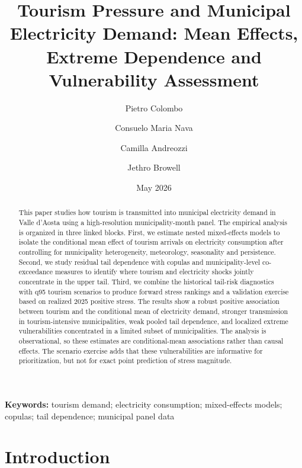 \documentclass[11pt,a4paper]{article}
\title{Tourism Pressure and Municipal Electricity Demand: Mean Effects, Extreme Dependence and Vulnerability Assessment}
\author{Pietro Colombo \and Consuelo Maria Nava \and Camilla Andreozzi \and Jethro Browell}
\date{May 2026}
\begin{document}
\maketitle

\begin{abstract}
This paper studies how tourism is transmitted into municipal electricity demand in Valle d'Aosta using a high-resolution municipality-month panel. The empirical analysis is organized in three linked blocks. First, we estimate nested mixed-effects models to isolate the conditional mean effect of tourism arrivals on electricity consumption after controlling for municipality heterogeneity, meteorology, seasonality and persistence. Second, we study residual tail dependence with copulas and municipality-level co-exceedance measures to identify where tourism and electricity shocks jointly concentrate in the upper tail. Third, we combine the historical tail-risk diagnostics with q95 tourism scenarios to produce forward stress rankings and a validation exercise based on realized 2025 positive stress. The results show a robust positive association between tourism and the conditional mean of electricity demand, stronger transmission in tourism-intensive municipalities, weak pooled tail dependence, and localized extreme vulnerabilities concentrated in a limited subset of municipalities. The analysis is observational, so these estimates are conditional-mean associations rather than causal effects. The scenario exercise adds that these vulnerabilities are informative for prioritization, but not for exact point prediction of stress magnitude.
\end{abstract}

\noindent\textbf{Keywords:} tourism demand; electricity consumption; mixed-effects models; copulas; tail dependence; municipal panel data

\section{Introduction}
\end{document}
